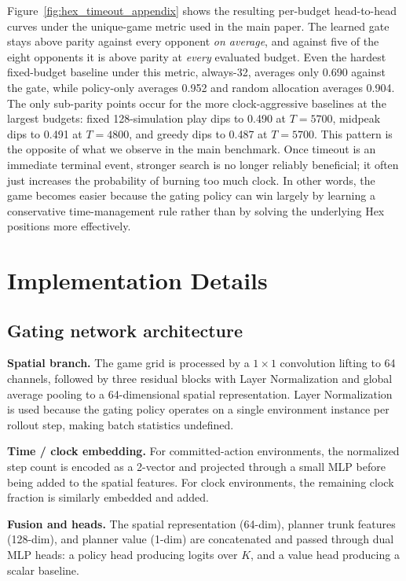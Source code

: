 Figure~\ref{fig:hex_timeout_appendix} shows the resulting per-budget head-to-head
curves under the unique-game metric used in the main paper. The learned gate stays
above parity against every opponent \emph{on average}, and against five of the eight
opponents it is above parity at \emph{every} evaluated budget. Even the hardest
fixed-budget baseline under this metric, always-32, averages only 0.690 against the
gate, while policy-only averages 0.952 and random allocation averages 0.904. The
only sub-parity points occur for the more clock-aggressive baselines at the largest
budgets: fixed 128-simulation play dips to 0.490 at $T{=}5700$, midpeak dips to
0.491 at $T{=}4800$, and greedy dips to 0.487 at $T{=}5700$. This pattern is the
opposite of what we observe in the main benchmark. Once timeout is an immediate
terminal event, stronger search is no longer reliably beneficial; it often just
increases the probability of burning too much clock. In other words, the game becomes
easier because the gating policy can win largely by learning a conservative
time-management rule rather than by solving the underlying Hex positions more
effectively.


\section{Implementation Details}
\label{app:implementation}

\subsection{Gating network architecture}

\textbf{Spatial branch.}
The game grid is processed by a $1{\times}1$ convolution lifting to 64 channels,
followed by three residual blocks with Layer Normalization and global average pooling
to a 64-dimensional spatial representation.
Layer Normalization is used because the gating policy operates on a single environment
instance per rollout step, making batch statistics undefined.

\textbf{Time / clock embedding.}
For committed-action environments, the normalized step count is encoded as a 2-vector
and projected through a small MLP before being added to the spatial features.
For clock environments, the remaining clock fraction is similarly embedded and added.

\textbf{Fusion and heads.}
The spatial representation (64-dim), planner trunk features (128-dim), and planner
value (1-dim) are concatenated and passed through dual MLP heads: a policy head
producing logits over $K$, and a value head producing a scalar baseline.

